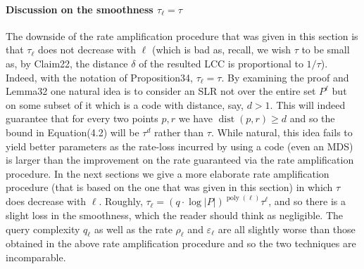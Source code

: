 \documentclass[10pt,a4paper]{article}
\begin{document}
\paragraph{Discussion on the smoothness $\tau_\ell=\tau$}
The downside of the rate amplification procedure that was given in this section is that $\tau_\ell$ does not decrease with $\ell$ (which is bad as, recall, we wish $\tau$ to be small as, by Claim22, the distance $\delta$ of the resulted LCC is proportional to $1/\tau$). Indeed, with the notation of Proposition34, $\tau_\ell=\tau$. By examining the proof and Lemma32 one natural idea is to consider an SLR not over the entire set $P^\ell$ but on some subset of it which is a code with distance, say, $d>1$. This will indeed guarantee that for every two points $p,r$ we have $\operatorname{dist}(p,r)\geq d$ and so the bound in Equation(4.2) will be $\tau^d$ rather than $\tau$. While natural, this idea fails to yield better parameters as the rate-loss incurred by using a code (even an MDS) is larger than the improvement on the rate guaranteed via the rate amplification procedure.
In the next sections we give a more elaborate rate amplification procedure (that is based on the one that was given in this section) in which $\tau$ does decrease with $\ell$. Roughly, $\tau_\ell=(q\cdot\log|P|)^{\operatorname{poly}(\ell)}\tau^\ell$, and so there is a slight loss in the smoothness, which the reader should think as negligible. The query complexity $q_\ell$ as well as the rate $\rho_\ell$ and $\varepsilon_\ell$ are all slightly worse than those obtained in the above rate amplification procedure and so the two techniques are incomparable.
\end{document}
